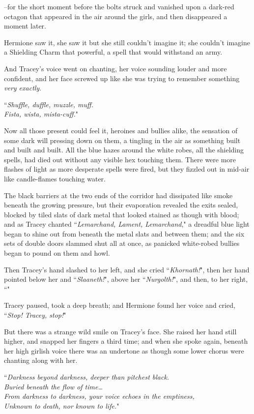 \---for the short moment before the bolts struck and vanished upon a dark-red octagon that appeared in the air around the girls, and then disappeared a moment later.

Hermione saw it, she saw it but she still couldn't imagine it; she couldn't imagine a Shielding Charm that powerful, a spell that would withstand an army.

And Tracey's voice went on chanting, her voice sounding louder and more confident, and her face screwed up like she was trying to remember something \emph{very exactly}.

``\emph{Shuffle, duffle, muzzle, muff.\\
Fista, wista, mista-cuff.}"

Now all those present could feel it, heroines and bullies alike, the sensation of some dark will pressing down on them, a tingling in the air as something built and built and built. All the blue hazes around the white robes, all the shielding spells, had died out without any visible hex touching them. There were more flashes of light as more desperate spells were fired, but they fizzled out in mid-air like candle-flames touching water.

The black barriers at the two ends of the corridor had dissipated like smoke beneath the growing pressure, but their evaporation revealed the exits sealed, blocked by tiled slats of dark metal that looked stained as though with blood; and as Tracey chanted ``\emph{Lemarchand, Lament, Lemarchand}," a dreadful blue light began to shine out from beneath the metal slats and between them; and the six sets of double doors slammed shut all at once, as panicked white-robed bullies began to pound on them and howl.

Then Tracey's hand slashed to her left, and she cried ``\emph{Khornath!}", then her hand pointed below her and ``\emph{Slaaneth!}", above her ``\emph{Nurgolth!}", and then, to her right, ``"

Tracey paused, took a deep breath; and Hermione found her voice and cried, ``\emph{Stop! Tracey, stop!}"

But there was a strange wild smile on Tracey's face. She raised her hand still higher, and snapped her fingers a third time; and when she spoke again, beneath her high girlish voice there was an undertone as though some lower chorus were chanting along with her.

``\emph{Darkness beyond darkness, deeper than pitchest black.\\
Buried beneath the flow of time{\ldots}\\
From darkness to darkness, your voice echoes in the emptiness,\\
Unknown to death, nor known to life.}"

